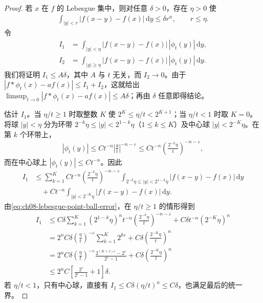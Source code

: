\documentclass[../../main.tex]{subfiles}
\begin{document}
\begin{proof}
若 $x$ 在 $f$ 的 Lebesgue 集中，则对任意 $\delta>0$，存在 $\eta>0$ 使
\begin{align}\label{eq:ch08-lebesgue-point-ball-error}
\int_{|y|<r}|f(x-y)-f(x)|\,\mathrm dy\leqslant\delta r^n,
\qquad r\leqslant\eta.
\end{align}
令
\begin{align*}
I_1&=\int_{|y|<\eta}|f(x-y)-f(x)|\,|\phi_t(y)|\,\mathrm dy,\\
I_2&=\int_{|y|\geqslant\eta}|f(x-y)-f(x)|\,|\phi_t(y)|\,\mathrm dy.
\end{align*}
我们将证明 $I_1\leqslant A\delta$，其中 $A$ 与 $t$ 无关，而 $I_2\to0$。由于 $|f*\phi_t(x)-af(x)|\leqslant I_1+I_2$，这就给出
$\limsup_{t\to0}|f*\phi_t(x)-af(x)|\leqslant A\delta$；再由 $\delta$ 任意即得结论。

估计 $I_1$。当 $\eta/t\geqslant1$ 时取整数 $K$ 使 $2^K\leqslant\eta/t<2^{K+1}$；当 $\eta/t<1$ 时取 $K=0$。将球 $|y|<\eta$ 分为环带
$2^{-k}\eta\leqslant|y|<2^{1-k}\eta$（$1\leqslant k\leqslant K$）及中心球 $|y|<2^{-K}\eta$。在第 $k$ 个环带上，
\begin{align*}
|\phi_t(y)|\leqslant Ct^{-n}\left|\frac yt\right|^{-n-\varepsilon}
\leqslant Ct^{-n}\left(\frac{2^{-k}\eta}t\right)^{-n-\varepsilon},
\end{align*}
而在中心球上 $|\phi_t(y)|\leqslant Ct^{-n}$。因此
\begin{align*}
I_1&\leqslant\sum_{k=1}^KCt^{-n}
\left(\frac{2^{-k}\eta}t\right)^{-n-\varepsilon}
\int_{2^{-k}\eta\leqslant|y|<2^{1-k}\eta}|f(x-y)-f(x)|\,\mathrm dy\\
&\quad+Ct^{-n}\int_{|y|<2^{-K}\eta}|f(x-y)-f(x)|\,\mathrm dy.
\end{align*}
由\cref{eq:ch08-lebesgue-point-ball-error}，在 $\eta/t\geqslant1$ 的情形得到
\begin{align*}
I_1
&\leqslant C\delta\sum_{k=1}^K(2^{1-k}\eta)^nt^{-n}
\left(\frac{2^{-k}\eta}t\right)^{-n-\varepsilon}
+C\delta t^{-n}(2^{-K}\eta)^n\\
&=2^nC\delta\left(\frac\eta t\right)^{-\varepsilon}
\sum_{k=1}^K2^{k\varepsilon}
+C\delta\left(\frac{2^{-K}\eta}t\right)^n\\
&=2^nC\delta\left(\frac\eta t\right)^{-\varepsilon}
\frac{2^{(K+1)\varepsilon}-2^\varepsilon}{2^\varepsilon-1}
+C\delta\left(\frac{2^{-K}\eta}t\right)^n\\
&\leqslant2^nC\left[\frac{2^\varepsilon}{2^\varepsilon-1}+1\right]\delta.
\end{align*}
若 $\eta/t<1$，只有中心球，直接有 $I_1\leqslant C\delta(\eta/t)^n\leqslant C\delta$，也满足最后的统一界。


\end{proof}
\end{document}
